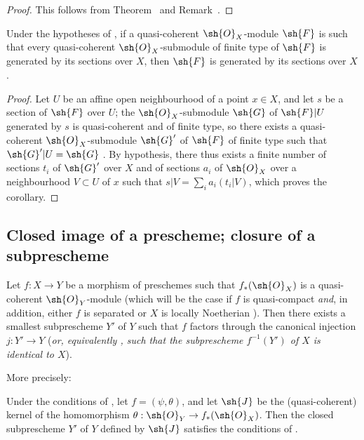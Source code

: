 \begin{proof}
This follows from Theorem~ and Remark~.
\end{proof}

\begin{corollary}[9.4.10]
\label{I.9.4.10}
Under the hypotheses of , if a quasi-coherent $\sh{O}_X$-module $\sh{F}$ is
such that every quasi-coherent $\sh{O}_X$-submodule of finite type of $\sh{F}$ is generated by
its sections over $X$, then $\sh{F}$ is generated by its sections over $X$.
\end{corollary}

\begin{proof}
Let $U$ be an affine open neighbourhood of a point $x\in X$, and let $s$ be a
section of $\sh{F}$ over $U$; the $\sh{O}_X$-submodule $\sh{G}$ of $\sh{F}|U$ generated by $s$
is quasi-coherent and of finite type, so there exists a quasi-coherent $\sh{O}_X$-submodule
$\sh{G}'$ of $\sh{F}$ of finite type such that $\sh{G}'|U=\sh{G}$ . By
hypothesis, there thus exists a finite number of sections $t_i$ of $\sh{G}'$ over $X$ and of
sections $a_i$ of $\sh{O}_X$ over a neighbourhood $V\subset U$ of $x$ such that
$s|V=\sum_i a_i(t_i|V)$, which proves the corollary.
\end{proof}

\subsection{Closed image of a prescheme; closure of a subprescheme}
\label{subsection:I.9.5}

\begin{proposition}[9.5.1]
\label{I.9.5.1}
Let $f:X\to Y$ be a morphism of preschemes such that $f_*(\sh{O}_X)$ is a quasi-coherent
$\sh{O}_Y$-module (which will be the case if $f$ is quasi-compact \emph{and}, in addition, either $f$ is separated or $X$ is locally Noetherian ). Then there exists a smallest
subprescheme $Y'$ of $Y$ such that $f$ factors through the canonical injection $j:Y'\to Y$
(\emph{or, equivalently , such that the subprescheme $f^{-1}(Y')$ of $X$ is
\emph{identical} to $X$}).
\end{proposition}

More precisely:
\begin{corollary}[9.5.2]
\label{I.9.5.2}
Under the conditions of , let $f=(\psi,\theta)$, and let $\sh{J}$ be the
(quasi-coherent) kernel of the homomorphism $\theta:\sh{O}_Y\to f_*(\sh{O}_X)$. Then the closed
subprescheme $Y'$ of $Y$ defined by $\sh{J}$ satisfies the conditions of .
\end{corollary}

